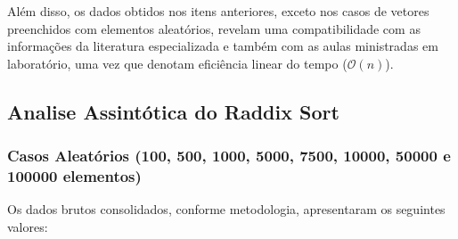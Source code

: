 \documentclass[a4paper, 12pt]{article}
\begin{document}
Além disso, os dados obtidos nos itens anteriores, exceto nos casos de vetores preenchidos com elementos aleatórios, revelam uma compatibilidade com as informações da literatura especializada e também com as aulas ministradas em laboratório, uma vez que denotam eficiência linear do tempo ($\mathcal{O}(n)$).

\subsection{Analise Assintótica do Raddix Sort}

\subsubsection{Casos Aleatórios (100, 500, 1000, 5000, 7500, 10000, 50000 e 100000 elementos)}

\tab{ }Os dados brutos consolidados, conforme metodologia, apresentaram os seguintes valores:
\vspace{0.3cm}
\end{document}
